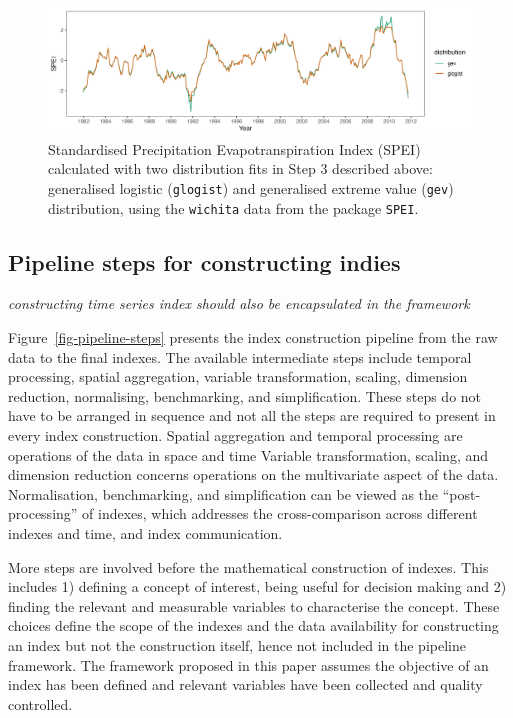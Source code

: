 \documentclass[
  letterpaper,
  DIV=11,
  numbers=noendperiod]{scrartcl}
\begin{document}
\begin{figure}

{\centering \includegraphics[width=1\textwidth,height=0.3\textheight]{../figures/toy-example-spei.png}

}

\caption{\label{fig-toy-example}Standardised Precipitation
Evapotranspiration Index (SPEI) calculated with two distribution fits in
Step 3 described above: generalised logistic (\texttt{glogist}) and
generalised extreme value (\texttt{gev}) distribution, using the
\texttt{wichita} data from the package \texttt{SPEI}.}

\end{figure}

\newpage

\hypertarget{pipeline-steps-for-constructing-indies}{%
\subsection{Pipeline steps for constructing
indies}\label{pipeline-steps-for-constructing-indies}}

\emph{constructing time series index should also be encapsulated in the
framework}

Figure~\ref{fig-pipeline-steps} presents the index construction pipeline
from the raw data to the final indexes. The available intermediate steps
include temporal processing, spatial aggregation, variable
transformation, scaling, dimension reduction, normalising, benchmarking,
and simplification. These steps do not have to be arranged in sequence
and not all the steps are required to present in every index
construction. Spatial aggregation and temporal processing are operations
of the data in space and time Variable transformation, scaling, and
dimension reduction concerns operations on the multivariate aspect of
the data. Normalisation, benchmarking, and simplification can be viewed
as the ``post-processing'' of indexes, which addresses the
cross-comparison across different indexes and time, and index
communication.

More steps are involved before the mathematical construction of indexes.
This includes 1) defining a concept of interest, being useful for
decision making and 2) finding the relevant and measurable variables to
characterise the concept. These choices define the scope of the indexes
and the data availability for constructing an index but not the
construction itself, hence not included in the pipeline framework. The
framework proposed in this paper assumes the objective of an index has
been defined and relevant variables have been collected and quality
controlled.
\end{document}
